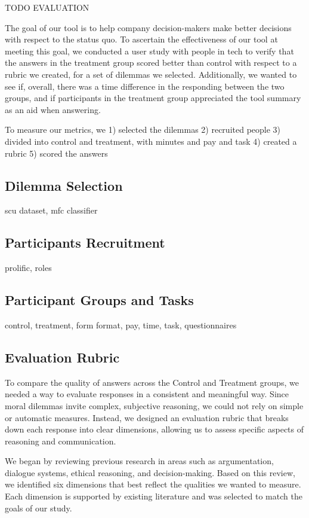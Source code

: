 \documentclass[sigconf, authorversion, nonacm, screen]{acmart}
\begin{document}
TODO EVALUATION

The goal of our tool is to help company decision-makers make better decisions with respect to the status quo.
To ascertain the effectiveness of our tool at meeting this goal, we conducted a user study with people in tech to verify that the answers in the treatment group scored better than control with respect to a rubric we created, for a set of dilemmas we selected.
Additionally, we wanted to see if, overall, there was a time difference in the responding between the two groups, and if participants in the treatment group appreciated the tool summary as an aid when answering.

To measure our metrics, we
1) selected the dilemmas
2) recruited people
3) divided into control and treatment, with minutes and pay and task
4) created a rubric
5) scored the answers

\subsection{Dilemma Selection}
scu dataset, mfc classifier
\subsection{Participants Recruitment}
prolific, roles
\subsection{Participant Groups and Tasks}
control, treatment, form format, pay, time, task, questionnaires
\subsection{Evaluation Rubric}
To compare the quality of answers across the Control and Treatment groups, we needed a way to evaluate responses in a consistent and meaningful way. Since moral dilemmas invite complex, subjective reasoning, we could not rely on simple or automatic measures. Instead, we designed an evaluation rubric that breaks down each response into clear dimensions, allowing us to assess specific aspects of reasoning and communication.

We began by reviewing previous research in areas such as argumentation, dialogue systems, ethical reasoning, and decision-making. Based on this review, we identified six dimensions that best reflect the qualities we wanted to measure. Each dimension is supported by existing literature and was selected to match the goals of our study.
\end{document}
